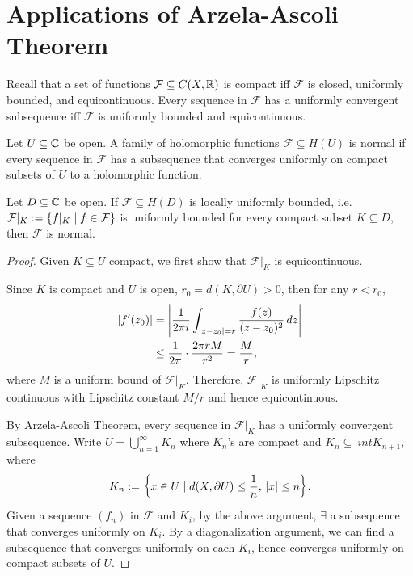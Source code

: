 \section{Applications of Arzela-Ascoli Theorem}

Recall that a set of functions $\mathcal F \subseteq C(X, {\mathbb R})$ is compact iff $\mathcal F$ is closed, uniformly bounded, and equicontinuous. Every sequence in $\mathcal F$ has a uniformly convergent subsequence iff $\mathcal F$ is uniformly bounded and equicontinuous.

\begin{df}
    Let $U \subseteq {\mathbb C}$ be open. A family of holomorphic functions $\mathcal F \subseteq H(U)$ is normal if every sequence in $\mathcal F$ has a subsequence that converges uniformly on compact subsets of $U$ to a holomorphic function.
\end{df}

\begin{thm}
    Let $D \subseteq {\mathbb C}$ be open. If $\mathcal F \subseteq H(D)$ is locally uniformly bounded, i.e. $\mathcal F|_K := {\left\{{f|_K \mid f \in \mathcal F}\right\}}$ is uniformly bounded for every compact subset $K \subseteq D$, then $\mathcal F$ is normal.
    \begin{proof}
        Given $K \subseteq U$ compact, we first show that $\mathcal F|_K$ is equicontinuous. 

        Since $K$ is compact and $U$ is open, $r_0 = d(K, \partial U) > 0$, then for any $r < r_0$, 
        \begin{align*}
            |f'(z_0)| &= {\left| \frac{1}{2\pi i} \int_{|z - z_0| = r} \frac{f(z)}{(z - z_0)^2} \, dz \right|} \\
            &\leq \frac{1}{2\pi} \cdot \frac{2\pi r M}{r^2} = \frac{M}{r},
        \end{align*}
        where $M$ is a uniform bound of $\mathcal F|_K$. Therefore, $\mathcal F|_K$ is uniformly Lipschitz continuous with Lipschitz constant $M/r$ and hence equicontinuous.

        By Arzela-Ascoli Theorem, every sequence in $\mathcal F|_K$ has a uniformly convergent subsequence. Write $U = \bigcup_{n=1}^\infty K_n$ where $K_n$'s are compact and $K_n \subseteq ~int K_{n+1}$, where
        \[
        K_n := {\left\{{x \in U \mid d(X, \partial U) \leq \frac{1}{n},\, |x| \leq n}\right\}}.
        \]
        Given a sequence $(f_n)$ in $\mathcal F$ and $K_i$, by the above argument, $\exists$ a subsequence that converges uniformly on $K_i$. By a diagonalization argument, we can find a subsequence that converges uniformly on each $K_i$, hence converges uniformly on compact subsets of $U$.
    \end{proof}
\end{thm}

